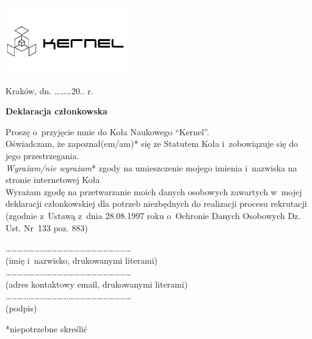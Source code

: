 \documentclass[a4paper,12pt]{article}
\begin{document}
\begin{flushright}
	\includegraphics[width=0.4\textwidth]{./../logo}
\end{flushright}
\vspace{-50pt}
Kraków, dn. \ldots\ldots\ldots 20.. r.\\
\begin{center}
\vspace{50pt}
\Large{\textbf{Deklaracja członkowska}}
\end{center}
\vspace{20pt}
Proszę o~przyjęcie mnie do Koła Naukowego ``Kernel''.\\
Oświadczam, że zapoznał(em/am)* się ze Statutem Koła i~zobowiązuje się do jego przestrzegania.\\

\vspace{10pt}
\textit{Wyrażam/nie wyrażam}* zgody na umieszczenie mojego imienia i~nazwiska na stronie internetowej Koła\\

\footnotesize{Wyrażam zgodę na przetwarzanie moich danych osobowych zawartych w~mojej deklaracji członkowskiej dla potrzeb niezbędnych do realizacji procesu rekrutacji (zgodnie z~Ustawą z~dnia 28.08.1997 roku o~Ochronie Danych Osobowych Dz. Ust. Nr~133 poz. 883)}\\

\vspace{30pt}
\begin{center}
\ldots\ldots\ldots\ldots\ldots\ldots\ldots\ldots\ldots\ldots\ldots\ldots\ldots\ldots\ldots\ldots\ldots\ldots\ldots\ldots\ldots\ldots\\
\footnotesize{(imię i~nazwisko, drukowanymi literami)}\\
\vspace{40pt}
\ldots\ldots\ldots\ldots\ldots\ldots\ldots\ldots\ldots\ldots\ldots\ldots\ldots\ldots\ldots\ldots\ldots\ldots\ldots\ldots\ldots\ldots\\
\footnotesize{(adres kontaktowy email, drukowanymi literami)}\\
\vspace{40pt}
\ldots\ldots\ldots\ldots\ldots\ldots\ldots\ldots\ldots\ldots\ldots\ldots\ldots\ldots\ldots\ldots\ldots\ldots\ldots\ldots\ldots\ldots\\
\footnotesize{(podpis)}
\end{center}
\vspace{50pt}
\footnotesize{*niepotrzebne skreślić}
\end{document}
